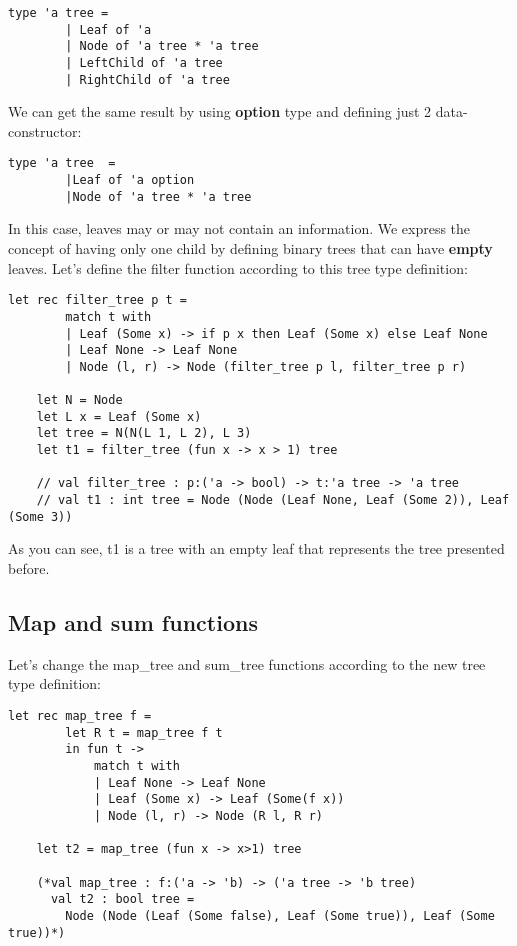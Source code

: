 \begin{lstlisting}[style = FSharpStyle]
    type 'a tree =
        | Leaf of 'a
        | Node of 'a tree * 'a tree
        | LeftChild of 'a tree
        | RightChild of 'a tree
\end{lstlisting}
We can get the same result by using \textbf{option} type and defining just 2 data-constructor:
\begin{lstlisting}[style = FSharpStyle]
    type 'a tree  = 
        |Leaf of 'a option
        |Node of 'a tree * 'a tree
\end{lstlisting}
In this case, leaves may or may not contain an information. We express the concept of having only one child by defining binary trees that can have \textbf{empty} leaves.\newline\newline
Let's define the filter function according to this tree type definition:
\begin{lstlisting}[style = FSharpStyle]
    let rec filter_tree p t =
        match t with
        | Leaf (Some x) -> if p x then Leaf (Some x) else Leaf None
        | Leaf None -> Leaf None
        | Node (l, r) -> Node (filter_tree p l, filter_tree p r)

    let N = Node
    let L x = Leaf (Some x)
    let tree = N(N(L 1, L 2), L 3)
    let t1 = filter_tree (fun x -> x > 1) tree

    // val filter_tree : p:('a -> bool) -> t:'a tree -> 'a tree
    // val t1 : int tree = Node (Node (Leaf None, Leaf (Some 2)), Leaf (Some 3))
\end{lstlisting}
As you can see, t1 is a tree with an empty leaf that represents the tree presented before.
\subsection{Map and sum functions}
Let's change the map\_tree and sum\_tree functions according to the new tree type definition:
\begin{lstlisting}[style = FSharpStyle]
    let rec map_tree f =
        let R t = map_tree f t
        in fun t ->
            match t with
            | Leaf None -> Leaf None
            | Leaf (Some x) -> Leaf (Some(f x))
            | Node (l, r) -> Node (R l, R r)

    let t2 = map_tree (fun x -> x>1) tree
    
    (*val map_tree : f:('a -> 'b) -> ('a tree -> 'b tree)
      val t2 : bool tree = 
        Node (Node (Leaf (Some false), Leaf (Some true)), Leaf (Some true))*)
\end{lstlisting}

